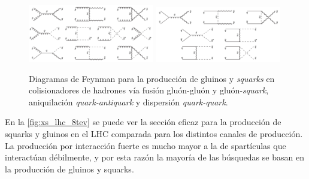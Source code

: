 \begin{figure}[!htb]
  \centering

  \includegraphics[width=0.49\textwidth]{figures/figure_102}
  \includegraphics[width=0.49\textwidth]{figures/figure_103}

  \caption{Diagramas de Feynman para la producción de gluinos y \emph{squarks} en
    colisionadores de hadrones vía fusión gluón-gluón y gluón-\emph{squark},
    aniquilación \emph{quark-antiquark} y dispersión \emph{quark-quark}.}
  \label{fig:strongprod}
\end{figure}





En la \cref{fig:xs_lhc_8tev} se puede ver la sección eficaz para la producción
de squarks y gluinos en el LHC comparada para los distintos canales de
producción. La producción por interacción fuerte es mucho mayor a la de
spartículas que interactúan débilmente, y por esta razón la mayoría de las
búsquedas se basan en la producción de gluinos y squarks.

